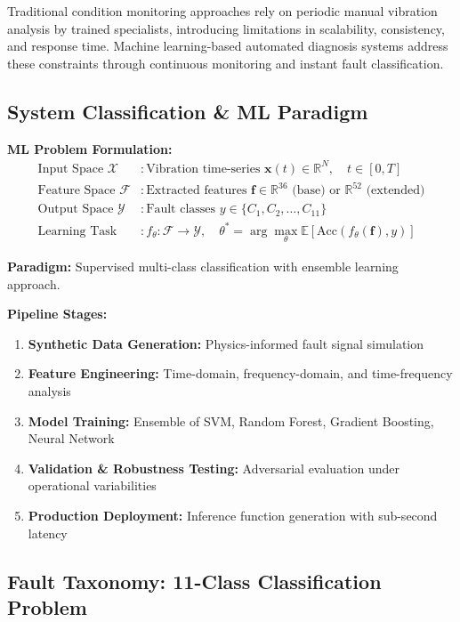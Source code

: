 \documentclass[11pt,a4paper]{article}
\begin{document}
Traditional condition monitoring approaches rely on periodic manual vibration analysis by trained specialists, introducing limitations in scalability, consistency, and response time. Machine learning-based automated diagnosis systems address these constraints through continuous monitoring and instant fault classification.

\subsection{System Classification \& ML Paradigm}

\begin{technical}
\textbf{ML Problem Formulation:}
\begin{align*}
\text{Input Space } \mathcal{X} &: \text{Vibration time-series } \mathbf{x}(t) \in \mathbb{R}^N, \quad t \in [0, T] \\
\text{Feature Space } \mathcal{F} &: \text{Extracted features } \mathbf{f} \in \mathbb{R}^{36} \text{ (base) or } \mathbb{R}^{52} \text{ (extended)} \\
\text{Output Space } \mathcal{Y} &: \text{Fault classes } y \in \{C_1, C_2, \ldots, C_{11}\} \\
\text{Learning Task} &: f_\theta : \mathcal{F} \rightarrow \mathcal{Y}, \quad \theta^* = \arg\max_\theta \mathbb{E}[\text{Acc}(f_\theta(\mathbf{f}), y)]
\end{align*}
\end{technical}

\textbf{Paradigm:} Supervised multi-class classification with ensemble learning approach.

\textbf{Pipeline Stages:}
\begin{enumerate}[leftmargin=*, itemsep=0.2em]
    \item \textbf{Synthetic Data Generation:} Physics-informed fault signal simulation
    \item \textbf{Feature Engineering:} Time-domain, frequency-domain, and time-frequency analysis
    \item \textbf{Model Training:} Ensemble of SVM, Random Forest, Gradient Boosting, Neural Network
    \item \textbf{Validation \& Robustness Testing:} Adversarial evaluation under operational variabilities
    \item \textbf{Production Deployment:} Inference function generation with sub-second latency
\end{enumerate}

\subsection{Fault Taxonomy: 11-Class Classification Problem}
\end{document}
